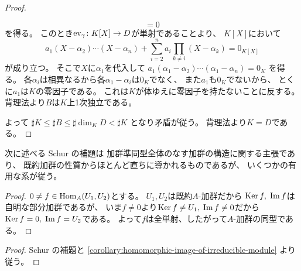 \documentclass[report]{jlreq}
\begin{document}
\begin{proof}
\begin{innerproof}
\begin{equation}
                = 0
        \end{equation}
        を得る。
        このとき$\mathrm{ev}_\gamma \colon K[X] \to D$が単射であることより、
        $K[X]$において
        \begin{equation}
            a_1 (X - \alpha_2) \cdots (X - \alpha_n)
                + \sum_{i = 2}^n a_i \prod_{k \neq i} (X - \alpha_k)
                = 0_{K[X]}
        \end{equation}
        が成り立つ。
        そこで$X$に$\alpha_1$を代入して
        $a_1 (\alpha_1 - \alpha_2) \cdots (\alpha_1 - \alpha_n) = 0_K$
        を得る。
        各$\alpha_i$は相異なるから各$\alpha_1 - \alpha_i$は$0_K$でなく、
        また$a_1$も$0_K$でないから、
        とくに$a_1$は$K$の零因子である。
        これは$K$が体ゆえに零因子を持たないことに反する。
        背理法より$B$は$K$上1次独立である。
    \end{innerproof}
    よって
    $\sharp K \le \sharp B \le \sharp \dim_K D < \sharp K$
    となり矛盾が従う。
    背理法より$K = D$である。
\end{proof}

次に述べる Schur の補題は
加群準同型全体のなす加群の構造に関する主張であり、
既約加群の性質からほとんど直ちに導かれるものであるが、
いくつかの有用な系が従う。


\begin{proof}
    $0 \neq f \in \operatorname{Hom}_A(U_1, U_2)$とする。
    $U_1, U_2$は既約$A$-加群だから
    $\operatorname{\mathrm{Ker}} f, \; \operatorname{\mathrm{Im}} f$は自明な部分加群であるが、
    いま$f \neq 0$より$\operatorname{\mathrm{Ker}} f \neq U_1, \; \operatorname{\mathrm{Im}} f \neq 0$だから
    $\operatorname{\mathrm{Ker}} f = 0, \; \operatorname{\mathrm{Im}} f = U_2$である。
    よって$f$は全単射、したがって$A$-加群の同型である。
\end{proof}


\begin{proof}
    Schur の補題と
    \cref{corollary:homomorphic-image-of-irreducible-module}
    より従う。
\end{proof}
\end{document}
